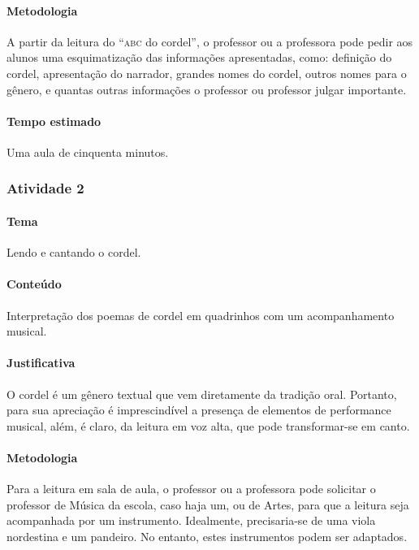 \documentclass[11pt]{extarticle}
\begin{document}
\paragraph{Metodologia} A partir da leitura do ``\textsc{abc} do cordel'', o professor ou a professora pode pedir
aos alunos uma esquimatização das informações apresentadas, como:
definição do cordel, apresentação do narrador, grandes nomes do cordel,
outros nomes para o gênero, e quantas outras informações o professor ou professor
julgar importante. 

\paragraph{Tempo estimado} Uma aula de cinquenta minutos.



\pagebreak

\subsubsection{Atividade 2}


\paragraph{Tema} Lendo e cantando o cordel. 


\paragraph{Conteúdo} Interpretação dos poemas de cordel em quadrinhos com um
acompanhamento musical.

\paragraph{Justificativa} O cordel é um gênero textual que vem diretamente da
tradição oral. Portanto, para sua apreciação é imprescindível 
a presença de elementos de performance musical, além, é claro, da leitura
em voz alta, que pode transformar-se em canto.

\paragraph{Metodologia} Para a leitura em sala de aula, o professor ou a professora pode solicitar o
professor de Música da escola, caso haja um, ou de Artes, para que a leitura
seja acompanhada por um instrumento. Idealmente, precisaria-se de uma viola nordestina 
e um pandeiro. No entanto, estes instrumentos podem ser adaptados. 
\end{document}
